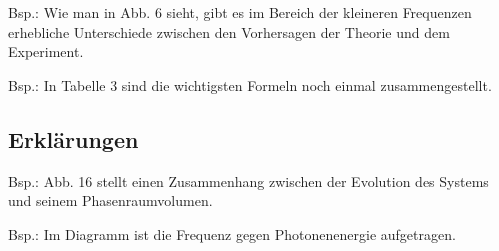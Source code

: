 \documentclass[../tephyna.tex]{subfiles}
\begin{document}
{
Bsp.: Wie man in Abb. 6 sieht, gibt es im Bereich der kleineren Frequenzen erhebliche Unterschiede zwischen den Vorhersagen der Theorie und dem Experiment.
}

{
Bsp.: In Tabelle 3 sind die wichtigsten Formeln noch einmal zusammengestellt.
}

\subsection{Erklärungen}

{
Bsp.: Abb. 16 stellt einen Zusammenhang zwischen der Evolution des Systems und seinem Phasenraumvolumen.
}

{
Bsp.: Im Diagramm ist die Frequenz gegen Photonenenergie aufgetragen.
}
\end{document}
